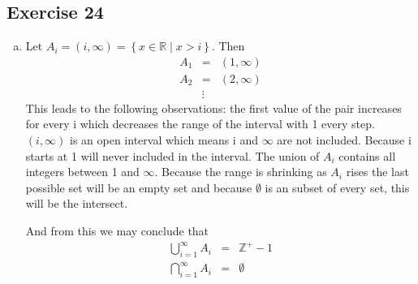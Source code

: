 \documentclass[a4paper]{article}
\newcommand{\exerciseenum}[2]{\subsection*{Exercise #1}{\begin{enumerate}[a)]#2\end{enumerate}}}
\newcommand{\set}[1]{\ensuremath{\left\{{#1}\right\}}}
\newcommand{\setbuild}[2]{\ensuremath{\set{{#1}\mid{#2}}}}
\newcommand{\RR}{\ensuremath{\mathbb{R}}}
\begin{document}
\exerciseenum{24}{%
\addtocounter{enumi}{3}
\item%
Let $A_i=(i,\infty)=\setbuild{x\in\RR}{x>i}$.
Then
\begin{eqnarray*}
A_1 &=& (1,\infty) \\
A_2 &=& (2,\infty) \\
    &\vdots&
\end{eqnarray*}
This leads to the following observations: the first value of the pair increases for every i which decreases the range of the interval with 1 every step. $(i, \infty)$ is an open interval which means i and $\infty$ are not included. Because i starts at 1 will never included in the interval. The union of $A_i$ contains all integers between 1 and $\infty$. Because the range is shrinking as $A_i$ rises the last possible set will be an empty set and because $\emptyset$ is an subset of every set, this will be the intersect.

And from this we may conclude that
\begin{eqnarray*}
\bigcup_{i=1}^{\infty} A_i &=& \mathbb{Z^+} - 1 \\
\bigcap_{i=1}^{\infty} A_i &=& \emptyset
\end{eqnarray*}

}
\end{document}
